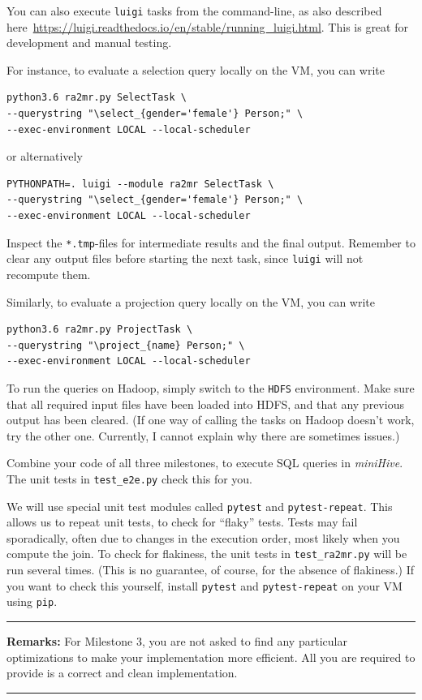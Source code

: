 \documentclass[12pt]{exam}
\begin{document}
\begin{questions}
\begin{Verbatim}[frame=single, fontsize=\small]
\end{Verbatim}


You can also execute \verb!luigi! tasks from the command-line, as also described here~\url{https://luigi.readthedocs.io/en/stable/running_luigi.html}.
This is great for development and manual testing.

For instance, to evaluate a selection query locally on the VM, you can write

\begin{Verbatim}[frame=single, fontsize=\small]
python3.6 ra2mr.py SelectTask \
--querystring "\select_{gender='female'} Person;" \
--exec-environment LOCAL --local-scheduler
\end{Verbatim}

or alternatively

\begin{Verbatim}[frame=single, fontsize=\small]
PYTHONPATH=. luigi --module ra2mr SelectTask \ 
--querystring "\select_{gender='female'} Person;" \ 
--exec-environment LOCAL --local-scheduler
\end{Verbatim}

Inspect the \verb!*.tmp!-files for intermediate results and the final output.
Remember to clear any output files before starting the next task,
since \verb!luigi! will not recompute them.

Similarly, to evaluate a projection query locally on the VM,
you can write

\begin{Verbatim}[frame=single, fontsize=\small]
python3.6 ra2mr.py ProjectTask \ 
--querystring "\project_{name} Person;" \ 
--exec-environment LOCAL --local-scheduler
\end{Verbatim}

To run the queries on Hadoop, simply switch to the \verb!HDFS! environment. Make sure that all required input files have been loaded into HDFS, and that any previous output has been cleared. (If one way of calling the tasks on Hadoop doesn't work, try the other one. Currently, I cannot explain why there are sometimes issues.)

\question
Combine your code of all three milestones, to execute SQL queries in {\em miniHive}\/. The unit tests in \verb!test_e2e.py! check this for you.

\end{questions}

We will use special unit test modules called \verb!pytest! and \verb!pytest-repeat!. This allows us to repeat unit tests, to check for ``flaky'' tests. Tests may fail sporadically, often due to changes in the execution order, most likely when you compute the join. To check for flakiness, the unit tests in \verb!test_ra2mr.py! will be run several times. (This is no guarantee, of course, for the absence of flakiness.)
        If you want to check this yourself, install \verb!pytest! and \verb!pytest-repeat! on your VM using \verb!pip!.

\bigskip
\noindent
\rule{\linewidth}{0.5mm}

{\bf Remarks:}
For Milestone 3, you are not asked to find any particular optimizations to make your implementation more efficient. All you are required to provide is a correct and clean implementation.

\noindent
\rule{\linewidth}{0.5mm}
\end{document}
